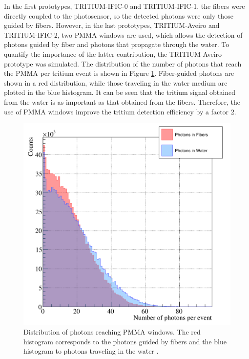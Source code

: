 In the first prototypes, TRITIUM-IFIC-0 and TRITIUM-IFIC-1, the fibers were directly coupled to the photosensor, so the detected photons were only those guided by fibers. However, in the last prototypes, TRITIUM-Aveiro and TRITIUM-IFIC-2, two PMMA windows are used, which allows the detection of photons guided by fiber and photons that propagate through the water. To quantify the importance of the latter contribution, the TRITIUM-Aveiro prototype was simulated. The distribution of the number of photons that reach the PMMA per tritium event is shown in Figure \ref{fig:PMMAEffect}. Fiber-guided photons are shown in a red distribution, while those traveling in the water medium are plotted in the blue histogram. It can be seen that the tritium signal obtained from the water is as important as that obtained from the fibers. Therefore, the use of PMMA windows improve the tritium detection efficiency by a factor 2.

\begin{figure}[hbtp]
\centering
\includegraphics[scale=0.3]{Figures/8SimulationsResults/81TRITIUMDesign/815PMMA/PhotonsDetectedWaterFiber.png}
\caption{Distribution of photons reaching PMMA windows. The red histogram corresponds to the photons guided by fibers and the blue histogram to photons traveling in the water \cite{SimulationPaperCarlos}.\label{fig:PMMAEffect}}
\end{figure}

